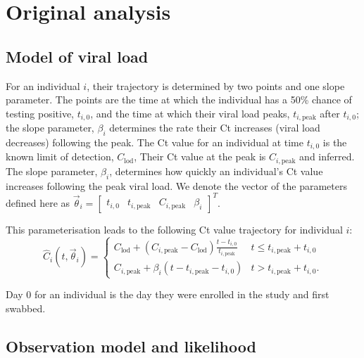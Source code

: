 \documentclass[thesis.tex]{subfiles}
\begin{document}
\section{Original analysis}


\subsection{Model of viral load}

For an individual $i$, their trajectory is determined by two points and one slope parameter.
The points are the time at which the individual has a 50\% chance of testing positive, $t_{i,0}$, and the time at which their viral load
peaks, $t_{i,\text{peak}}$ after $t_{i,0}$; the slope parameter, $\beta_i$ determines the rate their Ct increases (viral load decreases) following the peak.
The Ct value for an individual at time $t_{i,0}$ is the known limit of detection, $C_\text{lod}$,
Their Ct value at the peak is $C_{i,\text{peak}}$ and inferred.
The slope parameter, $\beta_i$, determines how quickly an individual's Ct value increases following the peak viral load.
We denote the vector of the parameters defined here as $\vec\theta_i = \begin{bmatrix} t_{i,0} & t_{i,\text{peak}} & C_{i,\text{peak}} &  \beta_i \end{bmatrix}^T$.

This parameterisation leads to the following Ct value trajectory for individual $i$:
$$
\hat{C}_i(t, \vec\theta_i) = \begin{cases}
  C_{\text{lod}} + (C_{i,\text{peak}} - C_{\text{lod}}) \frac{t - t_{i,0}}{t_{i,\text{peak}}}
    &t \leq t_{i,\text{peak}} + t_{i,0} \\
  C_{i,\text{peak}} + \beta_i (t - t_{i,\text{peak}} - t_{i,0})
    &t > t_{i,\text{peak}} + t_{i,0}.
\end{cases}
$$

Day 0 for an individual is the day they were enrolled in the study and first swabbed.

\subsection{Observation model and likelihood}
\end{document}
